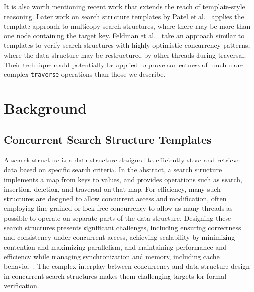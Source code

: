 \documentclass[a4paper,UKenglish,cleveref, autoref, thm-restate]{lipics-v2021}
\begin{document}

It is also worth mentioning recent work that extends the reach of template-style reasoning. Later work on search structure templates by Patel et al.~\cite{template-multi} applies the template approach to multicopy search structures, where there may be more than one node containing the target key. Feldman et al.~\cite{feldman2020proving} take an approach similar to templates to verify search structures with highly optimistic concurrency patterns, where the data structure may be restructured by other threads during traversal. Their technique could potentially be applied to prove correctness of much more complex \lstinline{traverse} operations than those we describe.

\section{Background}
\subsection{Concurrent Search Structure Templates}

A search structure is a data structure designed to efficiently store and retrieve data based on specific search criteria. In the abstract, a search structure implements a map from keys to values, and provides operations such as search, insertion, deletion, and traversal on that map. For efficiency, many such structures are designed to allow concurrent access and modification, often employing fine-grained or lock-free concurrency to allow as many threads as possible to operate on separate parts of the data structure. Designing these search structures presents significant challenges, including ensuring correctness and consistency under concurrent access, achieving scalability by minimizing contention and maximizing parallelism, and maintaining performance and efficiency while managing synchronization and memory, including cache behavior~\cite{masstree}. The complex interplay between concurrency and data structure design in concurrent search structures makes them challenging targets for formal verification.
\end{document}
